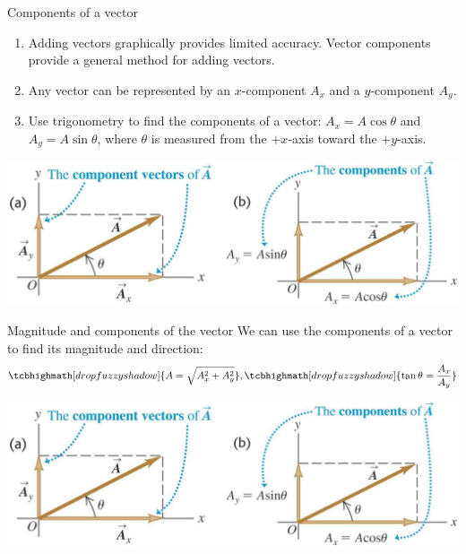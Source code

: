 \documentclass[18pt]{LectMechanics}
\begin{document}
\begin{frame}{Components of a vector}{}
	\begin{enumerate}
		\item Adding vectors graphically provides limited accuracy. Vector components
		      provide a general method for adding vectors.
		\item Any vector can be represented by an $x$-component $A_x$ and a
		      $y$-component $A_y$.
		\item Use trigonometry to find the components of a vector: $A_x = A\cos\theta$
		      and $A_y = A\sin\theta$, where $\theta$ is measured from the $+x$-axis toward
		      the $+y$-axis.
	\end{enumerate}
	\begin{center}
		\includegraphics[width=\linewidth]{Vector_components}
	\end{center}
\end{frame}



\begin{frame}{Magnitude and components of the vector}{}
	We can use the components of a vector to find its magnitude and direction:
	\begin{equation*}
		\tcbhighmath[drop fuzzy shadow]{A = \sqrt{A_x^2 + A_y^2}}, \tcbhighmath[drop fuzzy shadow]{\tan\theta = \frac{A_x}{A_y}}
	\end{equation*}
	\begin{center}
		\includegraphics[width=\linewidth]{Vector_components}
	\end{center}
\end{frame}
\end{document}
